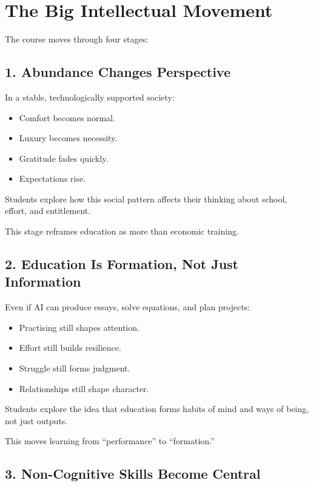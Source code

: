 \documentclass[12pt]{article}
\begin{document}
\section*{The Big Intellectual Movement}

The course moves through four stages:

\subsection*{1. Abundance Changes Perspective}

In a stable, technologically supported society:
\begin{itemize}
  \item Comfort becomes normal.
  \item Luxury becomes necessity.
  \item Gratitude fades quickly.
  \item Expectations rise.
\end{itemize}

Students explore how this social pattern affects their thinking about school, effort, and entitlement.

This stage reframes education as more than economic training.

\subsection*{2. Education Is Formation, Not Just Information}

Even if AI can produce essays, solve equations, and plan projects:
\begin{itemize}
  \item Practising still shapes attention.
  \item Effort still builds resilience.
  \item Struggle still forms judgment.
  \item Relationships still shape character.
\end{itemize}

Students explore the idea that education forms habits of mind and ways of being, not just outputs.

This moves learning from ``performance'' to ``formation.''

\subsection*{3. Non-Cognitive Skills Become Central}
\end{document}
